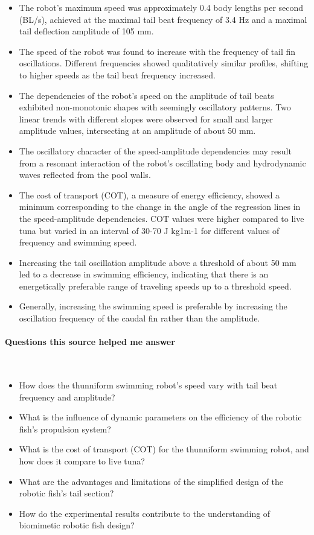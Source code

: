 \begin{itemize}
    \item The robot's maximum speed was approximately 0.4 body lengths per second (BL/s), achieved at the maximal tail beat frequency of 3.4 Hz and a maximal tail deflection amplitude of 105 mm.
    \item The speed of the robot was found to increase with the frequency of tail fin oscillations. Different frequencies showed qualitatively similar profiles, shifting to higher speeds as the tail beat frequency increased.
    \item The dependencies of the robot's speed on the amplitude of tail beats exhibited non-monotonic shapes with seemingly oscillatory patterns. Two linear trends with different slopes were observed for small and larger amplitude values, intersecting at an amplitude of about 50 mm.
    \item The oscillatory character of the speed-amplitude dependencies may result from a resonant interaction of the robot's oscillating body and hydrodynamic waves reflected from the pool walls.
    \item The cost of transport (COT), a measure of energy efficiency, showed a minimum corresponding to the change in the angle of the regression lines in the speed-amplitude dependencies. COT values were higher compared to live tuna but varied in an interval of 30-70 J kg1m-1 for different values of frequency and swimming speed.
    \item Increasing the tail oscillation amplitude above a threshold of about 50 mm led to a decrease in swimming efficiency, indicating that there is an energetically preferable range of traveling speeds up to a threshold speed.
    \item Generally, increasing the swimming speed is preferable by increasing the oscillation frequency of the caudal fin rather than the amplitude.    
\end{itemize}
    
\vspace*{-0.5cm}
\paragraph{Questions this source helped me answer} \

\begin{itemize}
    \item How does the thunniform swimming robot's speed vary with tail beat frequency and amplitude?
    \item What is the influence of dynamic parameters on the efficiency of the robotic fish's propulsion system?
    \item What is the cost of transport (COT) for the thunniform swimming robot, and how does it compare to live tuna?
    \item What are the advantages and limitations of the simplified design of the robotic fish's tail section?
    \item How do the experimental results contribute to the understanding of biomimetic robotic fish design?   
\end{itemize}

